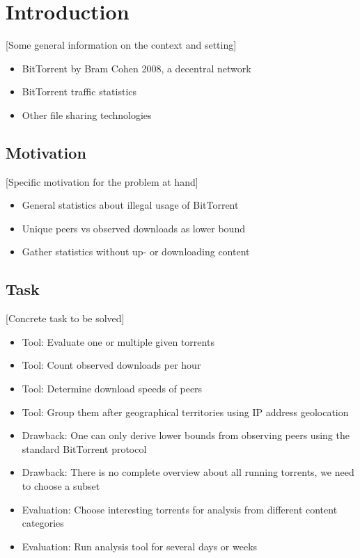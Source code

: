 \documentclass[10pt, a4paper]{scrartcl} %
\renewcommand{\_}{\origunderscore\allowbreak}
\begin{document}
\tableofcontents

\listoffigures

\listoftables
\newpage

\section{Introduction}
[Some general information on the context and setting]

\begin{itemize}
  \item BitTorrent by Bram Cohen 2008, a decentral network
  \item BitTorrent traffic statistics
  \item Other file sharing technologies
\end{itemize}

\subsection{Motivation}
[Specific motivation for the problem at hand]

\begin{itemize}
  \item General statistics about illegal usage of BitTorrent
  \item Unique peers vs observed downloads as lower bound
  \item Gather statistics without up- or downloading content
\end{itemize}

\subsection{Task}
[Concrete task to be solved]

\begin{itemize}
  \item Tool: Evaluate one or multiple given torrents
  \item Tool: Count observed downloads per hour
  \item Tool: Determine download speeds of peers
  \item Tool: Group them after geographical territories using IP address geolocation
  \item Drawback: One can only derive lower bounds from observing peers using the standard BitTorrent protocol
  \item Drawback: There is no complete overview about all running torrents, we need to choose a subset
  \item Evaluation: Choose interesting torrents for analysis from different content categories
  \item Evaluation: Run analysis tool for several days or weeks
\end{itemize}
\end{document}

